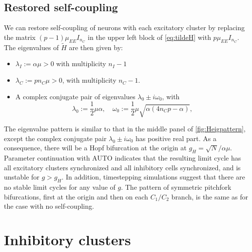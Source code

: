 \documentclass[reqno]{siamonline190516}
\newcommand{\revised}[1]{ \textbf{#1} }
\begin{document}
\subsection{Restored self-coupling} \label{sec:restore_selfCoup_Eclusters}
We can restore self-coupling of neurons with each excitatory cluster by replacing the matrix $(p-1) \mu_{EE} I_{n_C}$ in the upper left block of \cref{eq:tildeH} with $p \mu_{EE} I_{n_C}$. The eigenvalues of \revised{$\tilde{H}$} are then given by:
\begin{itemize}
\item $\lambda_I := \alpha \mu > 0$ with multiplicity $n_I - 1$
\item $\lambda_C := p n_C \mu > 0$, with multiplicity $n_C - 1$.
\item A complex conjugate pair of eigenvalues $\lambda_0 \pm i \omega_0$, with 
\begin{equation*}
    \lambda_0 := \frac{1}{2}\mu \alpha, \quad 
    \omega_0 := \frac{1}{2}\mu \sqrt{ \alpha( 4 n_C p - \alpha ) },
\end{equation*}
\end{itemize}
The eigenvalue pattern is similar to that in the middle panel of \cref{fig:Heigpattern}, except the complex conjugate pair $\lambda_0 \pm i \omega_0$ has positive real part. As a consequence, there will be a Hopf bifurcation at the origin at $g_H = \sqrt{N}/\alpha \mu$. Parameter continuation with AUTO indicates that the resulting limit cycle has all excitatory clusters synchronized and all inhibitory cells synchronized, and is unstable for $g > g_H$. In addition, timestepping simulations suggest that there are no stable limit cycles for any value of $g$. The pattern of symmetric pitchfork bifurcations, first at the origin and then on each $C_1/C_2$ branch, is the same as for the case with no self-coupling.

\section{Inhibitory clusters}\label{sec:inhibitoryclusters}
\end{document}
